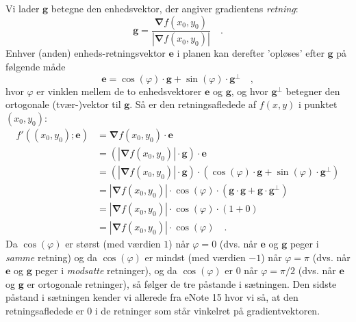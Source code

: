 \begin{bevis}
Vi lader $\mathbf{g}$ betegne den enhedsvektor, der angiver gradientens \emph{retning}:
\begin{equation}
\mathbf{g} = \frac{{\bm{\nabla}}f(x_{0}, y_{0})}{|{\bm{\nabla}}f(x_{0}, y_{0})|} \quad.
\end{equation}
Enhver (anden) enheds-retningsvektor $\mathbf{e}$ i planen kan derefter 'opløses' efter $\mathbf{g}$ på følgende måde
\begin{equation}
\mathbf{e} = \cos(\varphi)\cdot\mathbf{g} + \sin(\varphi)\cdot\mathbf{g}^{\bot}  \quad ,
\end{equation}
hvor $\varphi$ er vinklen mellem de to enhedsvektorer $\mathbf{e}$ og $\mathbf{g}$,  og hvor $\mathbf{g}^{\bot}$ betegner den ortogonale
(tvær-)vektor til $\mathbf{g}$.
Så er den retningsafledede af $f(x,y)$ i punktet $(x_{0}, y_{0})$:
\begin{equation}
\begin{aligned}
f'((x_{0}, y_{0}); \mathbf{e}) &= {\bm{\nabla}}f(x_{0}, y_{0})\,{\bm{\cdot}}\,\mathbf{e} \\
&= \left(|{\bm{\nabla}}f(x_{0}, y_{0})|\cdot \mathbf{g} \right)\,{\bm{\cdot}}\,\mathbf{e} \\
&= \left(|{\bm{\nabla}}f(x_{0}, y_{0})|\cdot \mathbf{g} \right)\,{\bm{\cdot}}\, \left(\cos(\varphi)\cdot\mathbf{g} + \sin(\varphi)\cdot\mathbf{g}^{\bot} \right) \\
&= |{\bm{\nabla}}f(x_{0}, y_{0})|\cdot \cos(\varphi)\cdot \left(\mathbf{g} \, {\bm{\cdot}}\,\mathbf{g} + \mathbf{g} \, {\bm{\cdot}}\,\mathbf{g}^{\bot}\right) \\
&= |{\bm{\nabla}}f(x_{0}, y_{0})|\cdot \cos(\varphi)\cdot \left(1 + 0\right) \\
&= |{\bm{\nabla}}f(x_{0}, y_{0})|\cdot \cos(\varphi) \quad .
\end{aligned}
\end{equation}
Da $\cos(\varphi)$ er størst (med værdien $1$) når $\varphi = 0$ (dvs. når $\mathbf{e}$ og $\mathbf{g}$ peger i \emph{samme} retning) og da
$\cos(\varphi)$ er mindst (med værdien $-1$) når $\varphi = \pi$ (dvs. når $\mathbf{e}$ og $\mathbf{g}$ peger i \emph{modsatte} retninger), og da
$\cos(\varphi)$ er $0$ når $\varphi = \pi/2$ (dvs. når $\mathbf{e}$ og $\mathbf{g}$ er ortogonale retninger), så følger de tre påstande i sætningen.
Den sidste påstand i sætningen kender vi allerede fra eNote 15 hvor vi så, at den retningsafledede er $0$ i de retninger som står vinkelret på gradientvektoren.
\end{bevis}

